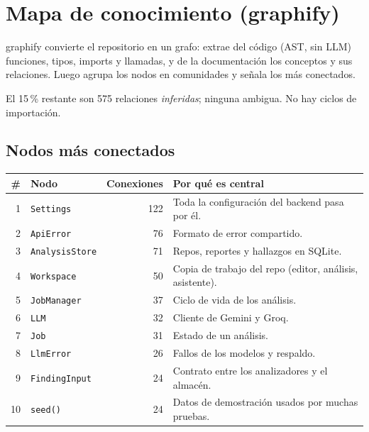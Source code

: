 \documentclass[11pt,a4paper]{article}
\newcommand{\code}[1]{\texttt{\small #1}}
\begin{document}
\section{Mapa de conocimiento (graphify)}

graphify convierte el repositorio en un grafo: extrae del código (AST, sin LLM) funciones, tipos, imports y llamadas,
y de la documentación los conceptos y sus relaciones. Luego agrupa los nodos en comunidades y señala los más
conectados.

\begin{center}
\end{center}

{\small El 15\,\% restante son 575 relaciones \emph{inferidas}; ninguna ambigua. No hay ciclos de importación.}

\subsection{Nodos más conectados}

\begin{center}
\begin{tabularx}{\linewidth}{@{}rlrL@{}}
\toprule
\textbf{\#} & \textbf{Nodo} & \textbf{Conexiones} & \textbf{Por qué es central} \\
 & \code{Settings} & 122 & Toda la configuración del backend pasa por él. \\
2 & \code{ApiError} & 76 & Formato de error compartido. \\
3 & \code{AnalysisStore} & 71 & Repos, reportes y hallazgos en SQLite. \\
4 & \code{Workspace} & 50 & Copia de trabajo del repo (editor, análisis, asistente). \\
5 & \code{JobManager} & 37 & Ciclo de vida de los análisis. \\
6 & \code{LLM} & 32 & Cliente de Gemini y Groq. \\
7 & \code{Job} & 31 & Estado de un análisis. \\
8 & \code{LlmError} & 26 & Fallos de los modelos y respaldo. \\
9 & \code{FindingInput} & 24 & Contrato entre los analizadores y el almacén. \\
10 & \code{seed()} & 24 & Datos de demostración usados por muchas pruebas. \\
\bottomrule
\end{tabularx}
\end{center}
\end{document}
